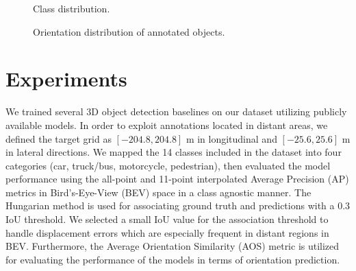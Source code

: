 \documentclass{article}
\begin{document}
\begin{figure}[t]
\begin{floatrow}
{\caption{Class distribution.}\label{fig:class_dist}
}
\end{floatrow}
\end{figure}

\begin{figure}[t]
\begin{floatrow}
{\caption{Orientation distribution of annotated objects.}\label{fig:orientation}
}
\end{floatrow}
\end{figure}

\section{Experiments}
\label{sec:experiments}
We trained several 3D object detection baselines on our dataset utilizing publicly available models. In order to exploit annotations located in distant areas, we defined the target grid as $[-204.8,204.8]$ m in longitudinal and $[-25.6,25.6]$ m in lateral directions. We mapped the 14 classes included in the dataset into four categories (car, truck/bus, motorcycle, pedestrian), then evaluated the model performance using the all-point and 11-point interpolated Average Precision (AP) metrics \citep{everingham2010pascal} in Bird's-Eye-View (BEV) space in a class agnostic manner. The Hungarian method \citep{kuhn1955hungarian} is used for associating ground truth and predictions with a 0.3 IoU threshold. We selected a small IoU value for the association threshold to handle displacement errors which are especially frequent in distant regions in BEV. Furthermore, the Average Orientation Similarity (AOS) \citep{geiger2012we} metric is utilized for evaluating the performance of the models in terms of orientation prediction. 
\end{document}
